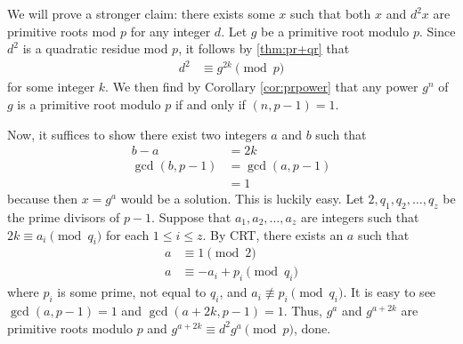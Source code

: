 \documentclass{subfile}
\begin{document}
	\begin{solution}
		We will prove a stronger claim: there exists some $x$ such that both $x$ and $d^2x$ are primitive roots mod $p$ for any integer $d$. Let $g$ be a primitive root modulo $p$. Since $d^2$ is a quadratic residue mod $p$, it follows by \autoref{thm:pr+qr} that
			\begin{align*}
				d^2
					& \equiv g^{2k} \pmod{p}
			\end{align*}
		for some integer $k$. We then find by Corollary \ref{cor:prpower} that any power $g^n$ of $g$ is a primitive root modulo $p$ if and only if $(n, p-1)=1$.

		Now, it suffices to show there exist two integers $a$ and $b$ such that
			\begin{align*}
				b-a
					& = 2k\\
				\gcd(b,p-1)
					& = \gcd(a,p-1)\\
					& = 1
			\end{align*}
		because then $x=g^a$ would be a solution.
		This is luckily easy. Let $2,q_1,q_2,\ldots,q_z$ be the prime divisors of $p-1$. Suppose that $a_1,a_2,\ldots,a_z$ are integers such that $2k \equiv a_i \pmod{q_i}$ for each $1 \le i \le z$.
		By CRT, there exists an $a$ such that
			\begin{align*}
				a
					& \equiv 1 \pmod{2}\\
				a
					& \equiv -a_i + p_i \pmod{q_i}
			\end{align*}
		where $p_i$ is some prime, not equal to $q_i$, and $a_i \not \equiv p_i \pmod{q_i}$. It is easy to see $\gcd(a,p-1) = 1$ and $\gcd(a+2k, p-1) = 1$. Thus, $g^a$ and $g^{a+2k}$ are primitive roots modulo $p$ and $g^{a+2k} \equiv d^2g^a \pmod{p}$, done.
	\end{solution}
\end{document}
